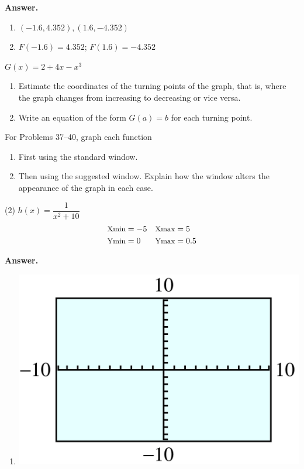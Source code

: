 \documentclass[10pt,]{book}
\theoremstyle{plain}
\theoremstyle{definition}
\theoremstyle{definition}
\theoremstyle{definition}
\theoremstyle{definition}
\numberwithin{equation}{part}
\newcommand{\amp}{&}
\begin{document}
\begin{exerciselist}
\begin{exercisegroup}
\begin{enumerate}[label=*\alph**]
\end{enumerate}
%
\par\smallskip
\noindent\textbf{Answer.}\hypertarget{answer-110}{}\quad
\leavevmode%
\begin{enumerate}[label=*\alph**]
\item\hypertarget{li-829}{}\((-1.6, 4.352), (1.6, -4.352)\)%
\item\hypertarget{li-830}{}\(F(-1.6) = 4.352\); \(F(1.6) = -4.352\)%
\end{enumerate}
%
\exercise[36.]\hypertarget{exercise-193}{}\(G(x) = 2 + 4x - x^3\) \leavevmode%
\begin{enumerate}[label=*\alph**]
\item\hypertarget{li-831}{}Estimate the coordinates of the turning points of the graph, that is, where the graph changes from increasing to decreasing or vice versa.%
\item\hypertarget{li-832}{}Write an equation of the form \(G(a) = b\) for each turning point.%
\end{enumerate}
%
\end{exercisegroup}
\par\smallskip\noindent
\hypertarget{exercisegroup-22}{}\par\noindent For Problems 37–40, graph each function \leavevmode%
\begin{enumerate}[label=*\alph**]
\item\hypertarget{li-833}{}First using the standard window.%
\item\hypertarget{li-834}{}Then using the suggested window. Explain how the window alters the appearance of the graph in each case.%
\end{enumerate}
%
\begin{exercisegroup}(2)
\exercise[37.]\hypertarget{exercise-194}{}\(h(x) = \dfrac{1}{x^2 + 10}\)%
\begin{align*}
{\small\text{Xmin}} \amp = -5 \amp\amp {\small\text{Xmax}} = 5
\\
{\small\text{Ymin}} \amp = 0 \amp\amp {\small\text{Ymax}} = 0.5
\end{align*}
%
\par\smallskip
\noindent\textbf{Answer.}\hypertarget{answer-111}{}\quad
\leavevmode%
\begin{enumerate}[label=*\alph**]
\item\hypertarget{li-835}{}\includegraphics[width=0.6\linewidth]{images/fig-ans-GC-standard-window.jpg}

\end{enumerate}
\end{exercisegroup}
\end{exerciselist}
\end{document}
